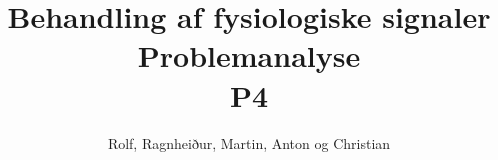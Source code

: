 \documentclass[12pt]{report}
\title{ Behandling af fysiologiske signaler\\ Problemanalyse\\ P4}
\author{Rolf, Ragnheiður, Martin, Anton og Christian}
\begin{document}
\maketitle

\tableofcontents
\newpage





	
	
	
	




\appendix

\listoftodos
\end{document}
